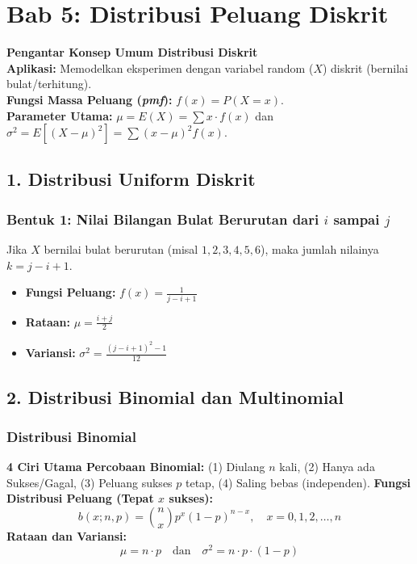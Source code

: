 \documentclass[12pt, a4paper]{article}
\begin{document}
\newpage
\section{Bab 5: Distribusi Peluang Diskrit}

\textbf{Pengantar Konsep Umum Distribusi Diskrit} \\
\textbf{Aplikasi:} Memodelkan eksperimen dengan variabel random ($X$) diskrit (bernilai bulat/terhitung). \\
\textbf{Fungsi Massa Peluang (\textit{pmf}):} $f(x) = P(X = x)$. \\
\textbf{Parameter Utama:} $\mu = E(X) = \sum x \cdot f(x)$ dan $\sigma^2 = E[(X - \mu)^2] = \sum (x - \mu)^2 f(x)$.

\subsection{1. Distribusi Uniform Diskrit}
\subsubsection{Bentuk 1: Nilai Bilangan Bulat Berurutan dari $i$ sampai $j$}
Jika $X$ bernilai bulat berurutan (misal $1, 2, 3, 4, 5, 6$), maka jumlah nilainya $k = j - i + 1$.
\begin{itemize}
    \item \textbf{Fungsi Peluang:} $f(x) = \frac{1}{j - i + 1}$
    \item \textbf{Rataan:} $\mu = \frac{i + j}{2}$
    \item \textbf{Variansi:} $\sigma^2 = \frac{(j - i + 1)^2 - 1}{12}$
\end{itemize}

\subsection{2. Distribusi Binomial dan Multinomial}

\subsubsection{Distribusi Binomial}
\textbf{4 Ciri Utama Percobaan Binomial:} (1) Diulang $n$ kali, (2) Hanya ada Sukses/Gagal, (3) Peluang sukses $p$ tetap, (4) Saling bebas (independen).
\textbf{Fungsi Distribusi Peluang (Tepat $x$ sukses):}
$$b(x; n, p) = \binom{n}{x} p^x (1-p)^{n-x}, \quad x = 0, 1, 2, \dots, n$$
\textbf{Rataan dan Variansi:}
$$\mu = n \cdot p \quad \text{dan} \quad \sigma^2 = n \cdot p \cdot (1 - p)$$
\end{document}
